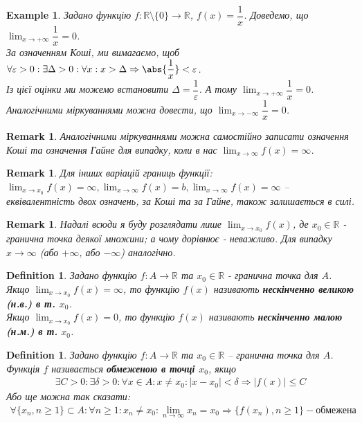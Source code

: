 \documentclass[a4paper, 14pt]{article}
\theoremstyle{theoremdd}
\theoremstyle{theoremdd}
\newtheorem{definition}[theorem]{Definition}
\theoremstyle{theoremdd}
\theoremstyle{theoremdd}
\newtheorem{example}[theorem]{Example}
\theoremstyle{theoremdd}
\theoremstyle{theoremdd}
\newtheorem{remark}[theorem]{Remark}
\theoremstyle{theoremdd}
\theoremstyle{theoremdd}
\begin{document}
	\begin{example}
	Задано функцію $f \colon \mathbb{R} \setminus \{0\} \to \mathbb{R}$, $f(x) = \dfrac{1}{x}$. Доведемо, що $\displaystyle\lim_{x \to +\infty} \dfrac{1}{x} = 0$.\\
	За означенням Коші, ми вимагаємо, щоб $\forall \varepsilon > 0: \exists \Delta > 0: \forall x: x > \Delta \Rightarrow \abs{\dfrac{1}{x}} < \varepsilon$.\\
	Із цієї оцінки ми можемо встановити $\Delta = \dfrac{1}{\varepsilon}$. А тому $\displaystyle\lim_{x \to +\infty} \dfrac{1}{x} = 0$. Аналогічними міркуваннями можна довести, що $\displaystyle\lim_{x \to -\infty} \dfrac{1}{x} = 0$.
	\end{example}
	
	\begin{remark}
	Аналогічними міркуваннями можна самостійно записати означення Коші та означення Гайне для випадку, коли в нас $\displaystyle \lim_{x \to \infty} f(x) = \infty$.
	\end{remark}
	
	\begin{remark}
	Для інших варіацій границь функції: $\displaystyle\lim_{x \to x_0} f(x) = \infty, \lim_{x \to \infty} f(x) = b, \lim_{x \to \infty} f(x) = \infty$ -- еквівалентність двох означень, за Коші та за Гайне, також залишається в силі.
	\end{remark}
	
	\begin{remark}
	Надалі всюди я буду розглядати лише $\displaystyle\lim_{x \to x_0} f(x)$, де $x_0 \in \mathbb{R}$ - гранична точка деякої множини; а чому дорівнює - неважливо. Для випадку $x \to \infty$ (або $+\infty$, або $-\infty$) аналогічно.
	\end{remark}
	
	\begin{definition}
	Задано функцію $f \colon A \to \mathbb{R}$ та $x_0 \in \mathbb{R}$ - гранична точка для $A$.\\
	Якщо $\displaystyle \lim_{x \to x_0} f(x) = \infty$, то функцію $f(x)$ називають \textbf{нескінченно великою (н.в.) в т. $x_0$}.\\
	Якщо $\displaystyle \lim_{x \to x_0} f(x) = 0$, то функцію $f(x)$ називають \textbf{нескінченно малою (н.м.) в т.} $x_0$.
	\end{definition}
	
	\begin{definition}
	Задано функцію $f \colon A \to \mathbb{R}$ та $x_0 \in \mathbb{R}$ -- гранична точка для $A$.\\
	Функція $f$ називається \textbf{обмеженою в точці $x_0$}, якщо
	\begin{align*}
	\exists C > 0: \exists \delta > 0: \forall x \in A: x \neq x_0: |x-x_0|<\delta \Rightarrow |f(x)| \leq C
	\end{align*}
	Або ще можна так сказати:
	\begin{align*}
	\forall \{x_n, n \geq 1\} \subset A: \forall n \geq 1: x_n \neq x_0: \lim_{n \to \infty} x_n = x_0 \Rightarrow \{f(x_n), n \geq 1\} - \text{обмежена}
	\end{align*}
	\end{definition}
	
\end{document}
